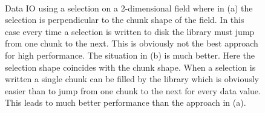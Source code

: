 \begin{figure}[tb]
\centering
\begin{minipage}[c]{0.68\linewidth}
\centering
{}\\
\end{minipage}
\hfill
\begin{minipage}[c]{0.3\linewidth}
\caption{{\small\label{fig:chunk_io}
Data IO using a selection on a 2-dimensional field where in (a) the selection is
perpendicular to the chunk shape of the field. In this case every time a
selection is written to disk the library must jump from one chunk to the next. 
This is obviously not the best approach for high performance.
The situation in (b) is much better. Here the selection shape coincides with the
chunk shape. When a selection is written a single chunk can be filled by the
library which is obviously easier than to jump from one chunk to the next for
every data value. This leads to much better performance than the approach in
(a).}}
\end{minipage}
\end{figure}
